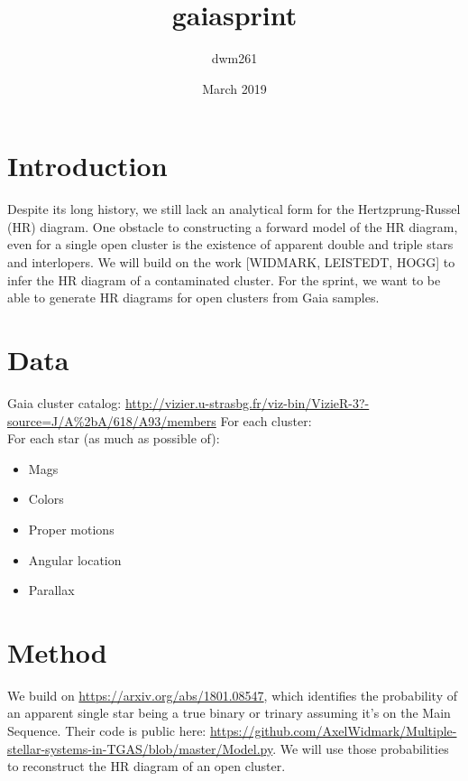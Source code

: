 \documentclass{article}
\title{gaiasprint}
\author{dwm261 }
\date{March 2019}
\begin{document}
\maketitle

\section{Introduction}

Despite its long history, we still lack an analytical form for the Hertzprung-Russel (HR) diagram. 
One obstacle to constructing a forward model of the HR diagram, even for a single open cluster is the existence of apparent double and triple stars and interlopers. 
We will build on the work [WIDMARK, LEISTEDT, HOGG] to infer the HR diagram of a contaminated cluster. 
For the sprint, we want to be able to generate HR diagrams for open clusters from Gaia samples.

\section{Data}

Gaia cluster catalog: \url{http://vizier.u-strasbg.fr/viz-bin/VizieR-3?-source=J/A%2bA/618/A93/members}
For each cluster:\\
For each star (as much as possible of):
    \begin{itemize}
        \item Mags
        \item Colors
        \item Proper motions
        \item Angular location
        \item Parallax
    \end{itemize}

\section{Method}

We build on \url{https://arxiv.org/abs/1801.08547}, which identifies the probability of an apparent single star being a true binary or trinary assuming it's on the Main Sequence.
Their code is public here: \url{https://github.com/AxelWidmark/Multiple-stellar-systems-in-TGAS/blob/master/Model.py}.
We will use those probabilities to reconstruct the HR diagram of an open cluster.
\end{document}
